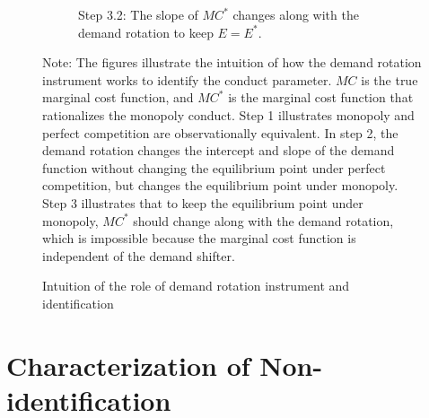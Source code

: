\documentclass[11pt, a4paper]{article}
\theoremstyle{remark}
\begin{document}
\begin{figure}[p!]
\begin{center}
\begin{subfigure}[b]{0.45\textwidth}
            \caption{Step 3.2: The slope of $MC^{*}$ changes along with the demand rotation to keep $E = E^{*}$.}
            \label{fig:identification_example_step_3_2}
        \end{subfigure}
    \end{center}
    \caption{Intuition of the role of demand rotation instrument and identification}
    \label{fig:identification_example}
    \vspace{2mm}
    \footnotesize
    Note: The figures illustrate the intuition of how the demand rotation instrument works to identify the conduct parameter.
    $MC$ is the true marginal cost function, and $MC^{*}$ is the marginal cost function that rationalizes the monopoly conduct.
    Step 1 illustrates monopoly and perfect competition are observationally equivalent.
    In step 2, the demand rotation changes the intercept and slope of the demand function without changing the equilibrium point under perfect competition, but changes the equilibrium point under monopoly.
    Step 3 illustrates that to keep the equilibrium point under monopoly, $MC^{*}$ should change along with the demand rotation, which is impossible because the marginal cost function is independent of the demand shifter.
\end{figure}







\section{Characterization of Non-identification}\label{sec:nonidentification_characterization}
\end{document}
